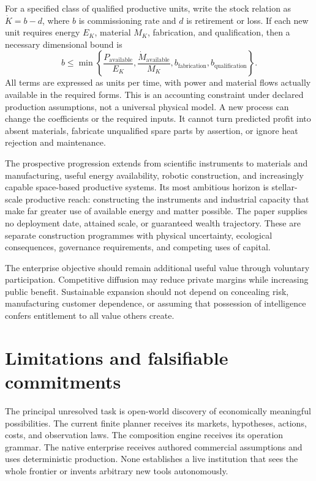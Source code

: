 \documentclass[11pt,letterpaper]{article}
\theoremstyle{remark}\newtheorem{remark}{Remark}[section]
\begin{document}
For a specified class of qualified productive units, write the stock relation as $\dot K=b-d$, where $b$ is commissioning rate and $d$ is retirement or loss. If each new unit requires energy $E_K$, material $M_K$, fabrication, and qualification, then a necessary dimensional bound is
\begin{equation}
b\leq\min\left\{\frac{P_{\mathrm{available}}}{E_K},
\frac{\dot M_{\mathrm{available}}}{M_K},b_{\mathrm{fabrication}},b_{\mathrm{qualification}}\right\}.
\label{eq:physical}
\end{equation}
All terms are expressed as units per time, with power and material flows actually available in the required forms. This is an accounting constraint under declared production assumptions, not a universal physical model. A new process can change the coefficients or the required inputs. It cannot turn predicted profit into absent materials, fabricate unqualified spare parts by assertion, or ignore heat rejection and maintenance.

The prospective progression extends from scientific instruments to materials and manufacturing, useful energy availability, robotic construction, and increasingly capable space-based productive systems. Its most ambitious horizon is stellar-scale productive reach: constructing the instruments and industrial capacity that make far greater use of available energy and matter possible. The paper supplies no deployment date, attained scale, or guaranteed wealth trajectory. These are separate construction programmes with physical uncertainty, ecological consequences, governance requirements, and competing uses of capital.

The enterprise objective should remain additional useful value through voluntary participation. Competitive diffusion may reduce private margins while increasing public benefit. Sustainable expansion should not depend on concealing risk, manufacturing customer dependence, or assuming that possession of intelligence confers entitlement to all value others create.

\section{Limitations and falsifiable commitments}\label{sec:limits}
The principal unresolved task is open-world discovery of economically meaningful possibilities. The current finite planner receives its markets, hypotheses, actions, costs, and observation laws. The composition engine receives its operation grammar. The native enterprise receives authored commercial assumptions and uses deterministic production. None establishes a live institution that sees the whole frontier or invents arbitrary new tools autonomously.
\end{document}
